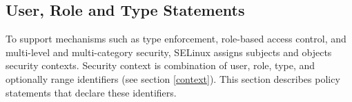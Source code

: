 
\subsection{User, Role and Type Statements}
\label{userroletype}
To support mechanisms such as type enforcement, role-based access control, and
multi-level and multi-category security, SELinux assigns subjects and objects
security contexts. Security context is combination of user, role, type, and
optionally range identifiers (see section \ref{context}). This section describes
policy statements that declare these identifiers.

